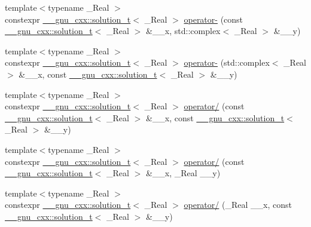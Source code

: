 \begin{DoxyCompactItemize}
\item 
{\footnotesize template$<$typename \+\_\+\+Real $>$ }\\constexpr \hyperlink{namespace____gnu__cxx_ae20ea642de50eb361074c62676b0159c}{\+\_\+\+\_\+gnu\+\_\+cxx\+::solution\+\_\+t}$<$ \+\_\+\+Real $>$ \hyperlink{namespacestd_a308d96e2c3172aebb97f03880e8c5946}{operator-\/} (const \hyperlink{namespace____gnu__cxx_ae20ea642de50eb361074c62676b0159c}{\+\_\+\+\_\+gnu\+\_\+cxx\+::solution\+\_\+t}$<$ \+\_\+\+Real $>$ \&\+\_\+\+\_\+x, std\+::complex$<$ \+\_\+\+Real $>$ \&\+\_\+\+\_\+y)
\item 
{\footnotesize template$<$typename \+\_\+\+Real $>$ }\\constexpr \hyperlink{namespace____gnu__cxx_ae20ea642de50eb361074c62676b0159c}{\+\_\+\+\_\+gnu\+\_\+cxx\+::solution\+\_\+t}$<$ \+\_\+\+Real $>$ \hyperlink{namespacestd_a4f4e9391eaa235d953faa99bff006e3d}{operator-\/} (std\+::complex$<$ \+\_\+\+Real $>$ \&\+\_\+\+\_\+x, const \hyperlink{namespace____gnu__cxx_ae20ea642de50eb361074c62676b0159c}{\+\_\+\+\_\+gnu\+\_\+cxx\+::solution\+\_\+t}$<$ \+\_\+\+Real $>$ \&\+\_\+\+\_\+y)
\item 
{\footnotesize template$<$typename \+\_\+\+Real $>$ }\\constexpr \hyperlink{namespace____gnu__cxx_ae20ea642de50eb361074c62676b0159c}{\+\_\+\+\_\+gnu\+\_\+cxx\+::solution\+\_\+t}$<$ \+\_\+\+Real $>$ \hyperlink{namespacestd_aea656103e37e932d00b9980288f00fac}{operator/} (const \hyperlink{namespace____gnu__cxx_ae20ea642de50eb361074c62676b0159c}{\+\_\+\+\_\+gnu\+\_\+cxx\+::solution\+\_\+t}$<$ \+\_\+\+Real $>$ \&\+\_\+\+\_\+x, const \hyperlink{namespace____gnu__cxx_ae20ea642de50eb361074c62676b0159c}{\+\_\+\+\_\+gnu\+\_\+cxx\+::solution\+\_\+t}$<$ \+\_\+\+Real $>$ \&\+\_\+\+\_\+y)
\item 
{\footnotesize template$<$typename \+\_\+\+Real $>$ }\\constexpr \hyperlink{namespace____gnu__cxx_ae20ea642de50eb361074c62676b0159c}{\+\_\+\+\_\+gnu\+\_\+cxx\+::solution\+\_\+t}$<$ \+\_\+\+Real $>$ \hyperlink{namespacestd_a303ec56de26f2f2490f5bbd085ab48f1}{operator/} (const \hyperlink{namespace____gnu__cxx_ae20ea642de50eb361074c62676b0159c}{\+\_\+\+\_\+gnu\+\_\+cxx\+::solution\+\_\+t}$<$ \+\_\+\+Real $>$ \&\+\_\+\+\_\+x, \+\_\+\+Real \+\_\+\+\_\+y)
\item 
{\footnotesize template$<$typename \+\_\+\+Real $>$ }\\constexpr \hyperlink{namespace____gnu__cxx_ae20ea642de50eb361074c62676b0159c}{\+\_\+\+\_\+gnu\+\_\+cxx\+::solution\+\_\+t}$<$ \+\_\+\+Real $>$ \hyperlink{namespacestd_a28e6ddaee7c29b09e84e85d2b52f5bc1}{operator/} (\+\_\+\+Real \+\_\+\+\_\+x, const \hyperlink{namespace____gnu__cxx_ae20ea642de50eb361074c62676b0159c}{\+\_\+\+\_\+gnu\+\_\+cxx\+::solution\+\_\+t}$<$ \+\_\+\+Real $>$ \&\+\_\+\+\_\+y)

\end{DoxyCompactItemize}
